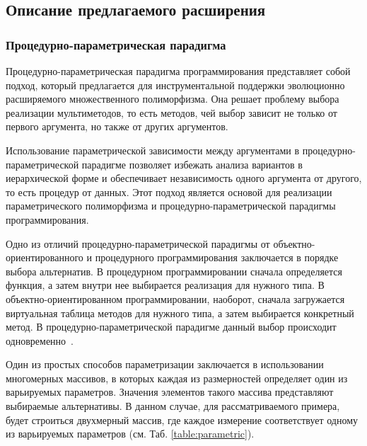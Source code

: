\subsection{Описание предлагаемого расширения}


\subsubsection{Процедурно-параметрическая парадигма}

Процедурно-параметрическая парадигма программирования представляет собой подход, который предлагается для инструментальной поддержки эволюционно расширяемого множественного полиморфизма. Она решает проблему выбора реализации мультиметодов, то есть методов, чей выбор зависит не только от первого аргумента, но также от других аргументов.

Использование параметрической зависимости между аргументами в процедурно-параметрической парадигме позволяет избежать анализа вариантов в иерархической форме и обеспечивает независимость одного аргумента от другого, то есть процедур от данных. Этот подход является основой для реализации параметрического полиморфизма и процедурно-параметрической парадигмы программирования.

Одно из отличий процедурно-параметрической парадигмы от объектно-ориен\-тированного и процедурного программирования заключается в порядке выбора альтернатив. В процедурном программировании сначала определяется функция, а затем внутри нее выбирается реализация для нужного типа. В объектно-ориентированном программировании, наоборот, сначала загружается виртуальная таблица методов для нужного типа, а затем выбирается конкретный метод.
В процедурно-параметрической парадигме данный выбор происходит одновременно~\cite{легалов2000процедурно}.

Один из простых способов параметризации заключается в использовании многомерных массивов, в которых каждая из размерностей определяет один из варьируемых параметров. Значения элементов такого массива представляют выбираемые альтернативы. В данном случае, для рассматриваемого примера, будет строиться двухмерный массив, где каждое измерение соответствует одному из варьируемых параметров (см. Таб. \ref{table:parametric}).

